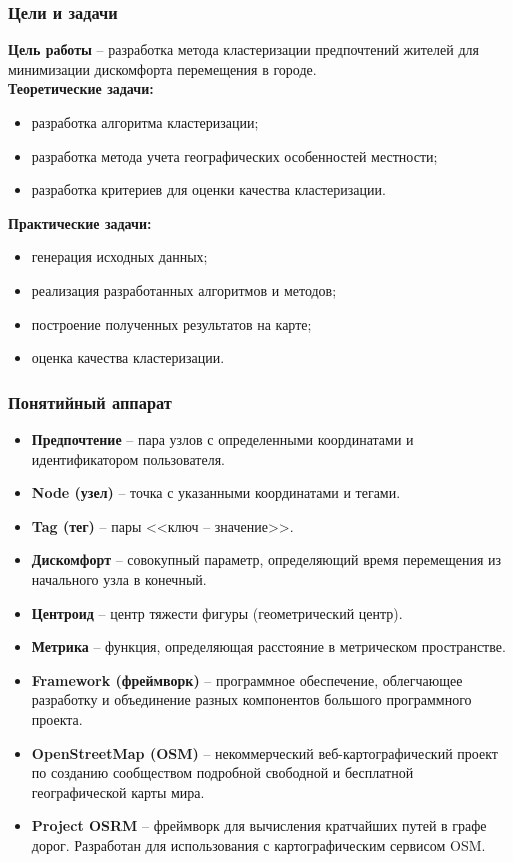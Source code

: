 \begin{frame} %
    \frametitle{Цели и задачи}
    \textbf{Цель работы} -- разработка метода кластеризации предпочтений
    жителей для минимизации дискомфорта перемещения в городе.\\
    \textbf{Теоретические задачи:}
    \begin{itemize}
        \item разработка алгоритма кластеризации;
        \item разработка метода учета географических особенностей местности;
        \item разработка критериев для оценки качества кластеризации.
    \end{itemize}
    \textbf{Практические задачи:}
    \begin{itemize}
        \item генерация исходных данных;
        \item реализация разработанных алгоритмов и методов;
        \item построение полученных результатов на карте;
        \item оценка качества кластеризации.
    \end{itemize}
\end{frame}

\begin{frame}
    \frametitle{Понятийный аппарат}
    \footnotesize
    \begin{itemize}\itemsep-5pt
        \item \textbf{Предпочтение} -- пара узлов с определенными координатами
            и идентификатором пользователя.
        \item \textbf{Node (узел)} -- точка с указанными координатами и тегами.
        \item \textbf{Tag (тег)} -- пары <<ключ -- значение>>.
        \item \textbf{Дискомфорт} -- совокупный параметр, определяющий время
            перемещения из начального узла в конечный.
        \item \textbf{Центроид} -- центр тяжести фигуры (геометрический центр).
        \item \textbf{Метрика} -- функция, определяющая расстояние в
            метрическом пространстве.
        \item \textbf{Framework (фреймворк)} -- программное обеспечение, облегчающее разработку и
            объединение разных компонентов большого программного проекта.
        \item \textbf{OpenStreetMap (OSM)} -- некоммерческий веб-картографический проект по созданию
            сообществом подробной свободной и бесплатной географической карты мира.
        \item \textbf{Project OSRM} -- фреймворк для вычисления кратчайших путей в графе дорог.
            Разработан для использования с картографическим сервисом OSM.
    \end{itemize}
\end{frame}

